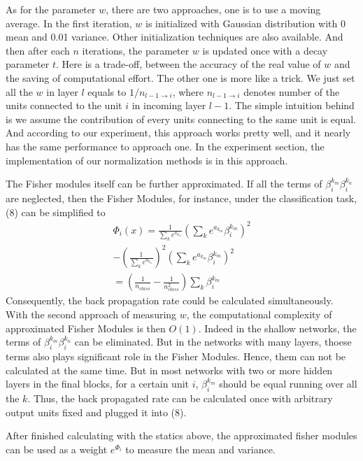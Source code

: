 \documentclass{sig-alternate}
\begin{document}
    As for the parameter $w$, there are two approaches, one is to use a moving average. In the first iteration, $w$ is initialized with Gaussian distribution with 0 mean and 0.01 variance. Other initialization techniques are also available. And then after each $n$ iterations, the parameter $w$ is updated once with a decay parameter $t$. Here is a trade-off, between the accuracy of the real value of $w$ and the saving of computational effort. The other one is more like a trick. We just set all the $w$ in layer $l$ equals to $1/n_{l-1\rightarrow i}$, where $n_{l-1\rightarrow i}$ denotes number of the units connected to the unit $i$ in incoming layer $l-1$. The simple intuition behind is we assume the contribution of every units connecting to the same unit is equal. And according to our experiment, this approach works pretty well, and it nearly has the same performance to approach one. In the experiment section, the implementation of our normalization methods is in this approach. 
    
    The Fisher modules itself can be further approximated. If all the terms of $\beta_i^{k_m}\beta_i^{k_n}$ are neglected, then the Fisher Modules, for instance, under the classification task, (8) can be simplified to
    \begin{equation}
        \begin{aligned}
         \Phi_i(x)= \frac{1}{\sum_k e^{a_{k_m}}}(\sum_k e^{a_{k_m}}\beta_i^{k_m})^{2}\\
         -(\frac{1}{\sum_k e^{a_{k_m}}})^{2}(\sum_k e^{a_{k_m}}\beta_i^{k_m})^{2}\\
         = (\frac{1}{n_{class}} - \frac{1}{n_{class}^{2}})\sum_k\beta_i^{k_m} 
        \end{aligned}
    \end{equation}
    Consequently, the back propagation rate could be calculated simultaneously. With the second approach of measuring $w$, the computational complexity of approximated Fisher Modules is then $O(1)$. 
    Indeed in the shallow networks, the terms of $\beta_i^{k_m}\beta_i^{k_n}$ can be eliminated. But in the networks with many layers, thoese terms also plays significant role in the Fisher Modules. Hence, them can not be calculated at the same time. But in most networks with two or more hidden layers in the final blocks, for a certain unit $i$, $\beta_i^{k_m}$ should be equal running over all the $k$. Thus, the back propagated rate can be calculated once with arbitrary output units fixed and plugged it into (8). 
    
    After finished calculating with the statics above, the approximated fisher modules can be used as a weight $e^{\Phi_i}$ to measure the mean and variance.
    
\end{document}

